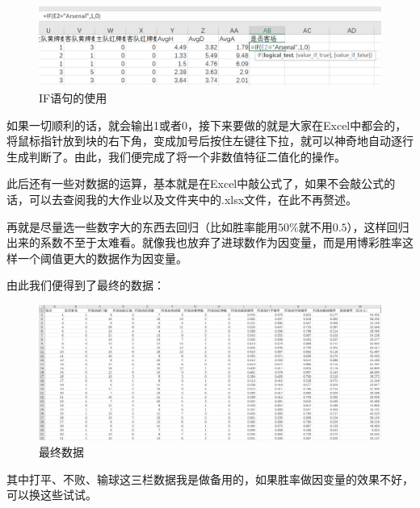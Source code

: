 \documentclass[10pt, a4paper]{article}
\begin{document}
\begin{figure}[H]
    \centering
    \includegraphics[width=0.9\linewidth]{IF.png}
    \caption{IF语句的使用}
    \label{fig:IF}
\end{figure}\par
如果一切顺利的话，就会输出1或者0，接下来要做的就是大家在Excel中都会的，将鼠标指针放到块的右下角，变成加号后按住左键往下拉，就可以神奇地自动逐行生成判断了。由此，我们便完成了将一个非数值特征二值化的操作。\par
此后还有一些对数据的运算，基本就是在Excel中敲公式了，如果不会敲公式的话，可以去查阅我的大作业以及文件夹中的.xlsx文件，在此不再赘述。\par
再就是尽量选一些数字大的东西去回归（比如胜率能用$50\%$就不用$0.5$），这样回归出来的系数不至于太难看。就像我也放弃了进球数作为因变量，而是用博彩胜率这样一个阈值更大的数据作为因变量。\par
由此我们便得到了最终的数据：

\begin{figure}[H]
    \centering
    \includegraphics[width=\linewidth]{final.png}
    \caption{最终数据}
    \label{fig:final}
\end{figure}\par

其中打平、不败、输球这三栏数据我是做备用的，如果胜率做因变量的效果不好，可以换这些试试。
\end{document}

